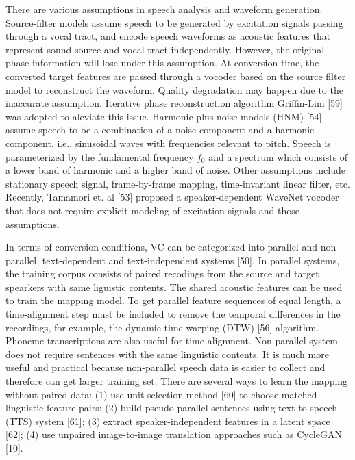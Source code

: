 \documentclass{article}
\begin{document}
There are various assumptions in speech analysis and waveform generation. Source-filter models assume speech to be generated by excitation signals passing through a vocal tract, and encode speech waveforms as acoustic features that represent sound source and vocal tract independently. However, the original phase information will lose under this assumption. At conversion time, the converted target features are passed through a vocoder based on the source filter model to reconstruct the waveform. Quality degradation may happen due to the inaccurate assumption. Iterative phase reconstruction algorithm Griffin-Lim [59] was adopted to aleviate this issue. Harmonic plus noise models (HNM) [54] assume speech to be a combination of a noise component and a harmonic component, i.e., sinusoidal waves with frequencies relevant to pitch. Speech is parameterized by the fundamental frequency $f_0$ and a spectrum which consists of a lower band of harmonic and a higher band of noise. Other assumptions include
stationary speech signal, %
frame-by-frame mapping, %
time-invariant linear filter, etc. Recently, Tamamori et. al [53] proposed a speaker-dependent WaveNet vocoder that does not require explicit modeling of excitation signals and those assumptions. 


In terms of conversion conditions, VC can be categorized into parallel and non-parallel, text-dependent and text-independent systems [50]. In parallel systems, the training corpus consists of paired recodings from the source and target spearkers with same liguistic contents. The shared acoustic features can be used to train the mapping model. To get parallel feature sequences of equal length, a time-alignment step must be included to remove the temporal differences in the recordings, for example, the dynamic time warping (DTW) [56] algorithm. Phoneme transcriptions are also useful for time alignment. Non-parallel system does not require sentences with the same linguistic contents. It is much more useful and practical because non-parallel speech data is easier to collect and therefore can get larger training set. There are several ways to learn the mapping without paired data: (1) use unit selection method [60] to choose matched linguistic feature pairs; (2) build pseudo parallel sentences using text-to-speech (TTS) system [61]; (3) extract speaker-independent features in a latent space [62]; (4) use unpaired image-to-image translation approaches such as CycleGAN [10]. 
\end{document}
